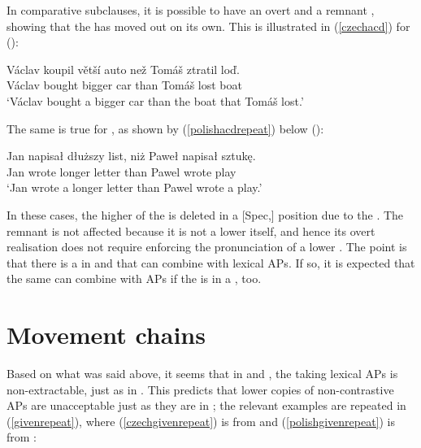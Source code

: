 In comparative subclauses, it is possible to have an overt  and a remnant , showing that the  has moved out on its own. This is illustrated in (\ref{czechacd}) for  (\citealt[105, ex. 32b]{kennedymerchant2000}):

\ea \gll Václav	koupil větší auto	než	Tomáš	ztratil	loď. \label{czechacd}\\
Václav bought	bigger car than	Tomáš	lost boat\\
\glt `Václav bought a bigger car than the boat that Tomáš lost.'
\z

The same is true for , as shown by (\ref{polishacdrepeat}) below (\citealt[104, ex. 31a]{kennedymerchant2000}):

\ea \gll Jan napisa\l{} d\l{}u\.{z}szy list, ni\.{z} Pawe\l{} napisa\l{} sztuk\k{e}. \label{polishacdrepeat}\\
Jan wrote longer letter than Pawel wrote play\\
\glt `Jan wrote a longer letter than Pawel wrote a play.'
\z

In these cases, the higher  of the  is deleted in a [Spec,] position due to the . The remnant  is not affected because it is not a lower  itself, and hence its overt realisation does not require enforcing the pronunciation of a lower . The point is that there is a  in  and  that can combine with lexical APs. If so, it is expected that the same  can combine with APs if the  is in a , too.

\section{Movement chains} \label{sec:5movement}
Based on what was said above, it seems that in  and , the  taking lexical APs is non-extractable, just as in . This predicts that lower copies of non-contrastive APs are unacceptable just as they are in ; the relevant examples are repeated in (\ref{givenrepeat}), where (\ref{czechgivenrepeat}) is from  and (\ref{polishgivenrepeat}) is from :

\ea \label{givenrepeat}
\z
\z

